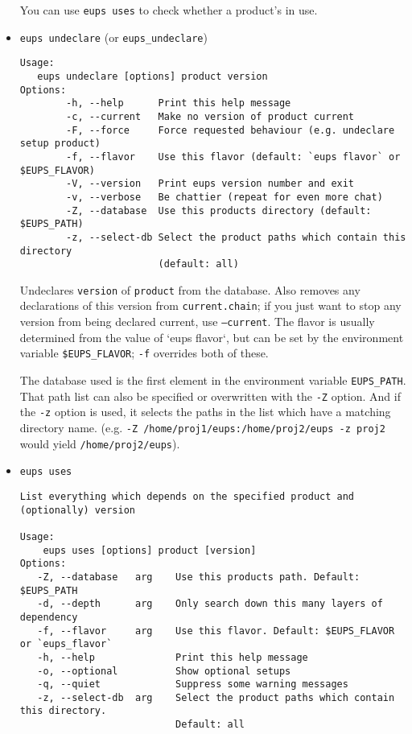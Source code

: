 \documentclass{article}
\newcommand{\code}[1]{\texttt{#1}}
\begin{document}
\begin{itemize}
You can use \code{eups uses} to check whether a product's in use.
  

  \item \code{eups undeclare} (or \code{eups\_undeclare})
\begin{verbatim}
Usage:
   eups undeclare [options] product version
Options:
        -h, --help      Print this help message
        -c, --current   Make no version of product current
        -F, --force     Force requested behaviour (e.g. undeclare setup product)
        -f, --flavor    Use this flavor (default: `eups flavor` or $EUPS_FLAVOR)
        -V, --version   Print eups version number and exit
        -v, --verbose   Be chattier (repeat for even more chat)
        -Z, --database  Use this products directory (default: $EUPS_PATH)
        -z, --select-db Select the product paths which contain this directory 
                        (default: all)
\end{verbatim}
  
Undeclares \code{version} of \code{product} from the database. Also
removes any declarations of this version from \code{current.chain}; if
you just want to stop any version from being declared current, use
\code{--current}. The flavor is usually determined from the value
of `eups flavor`, but can be set by the
environment variable \code{\$EUPS\_FLAVOR}; \code{-f} overrides
both of these.

The database used is the first element in the environment
variable \code{EUPS\_PATH}. That path list can also be specified or
overwritten with the \code{-Z} option. And if the \code{-z} option is
used, it selects the paths in the list which have a matching directory
name. (e.g. \code{-Z /home/proj1/eups:/home/proj2/eups -z proj2} would
yield \code{/home/proj2/eups}).


\item \code{eups uses}
\begin{verbatim}
List everything which depends on the specified product and (optionally) version

Usage:
    eups uses [options] product [version]
Options:
   -Z, --database   arg    Use this products path. Default: $EUPS_PATH
   -d, --depth      arg    Only search down this many layers of dependency
   -f, --flavor     arg    Use this flavor. Default: $EUPS_FLAVOR or `eups_flavor`
   -h, --help              Print this help message
   -o, --optional          Show optional setups
   -q, --quiet             Suppress some warning messages
   -z, --select-db  arg    Select the product paths which contain this directory.
                           Default: all
\end{verbatim}


\end{itemize}
\end{document}
